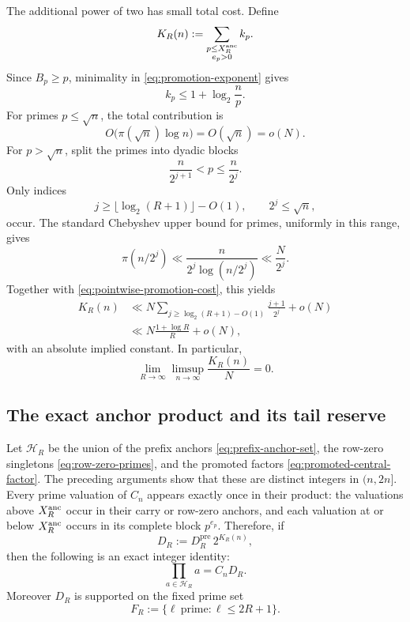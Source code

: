 \documentclass[11pt]{article}
\numberwithin{equation}{section}
\theoremstyle{definition}
\theoremstyle{remark}
\newcommand{\1}{\mathbf 1}
\newcommand{\e}{\mathrm e}
\begin{document}
The additional power of two has small total cost.  Define
\begin{equation}
 K_R(n):=\sum_{\substack{p\le X_R^{\rm anc}\\e_p>0}}k_p.
 \label{eq:total-promotion-cost}
\end{equation}
Since \(B_p\ge p\), minimality in
\eqref{eq:promotion-exponent} gives
\begin{equation}
                     k_p\le1+\log_2\frac np.
                     \label{eq:pointwise-promotion-cost}
\end{equation}
For primes \(p\le\sqrt n\), the total contribution is
\[
        O\bigl(\pi(\sqrt n)\log n\bigr)=O(\sqrt n)=o(N).
\]
For \(p>\sqrt n\), split the primes into dyadic blocks
\[
       \frac{n}{2^{j+1}}<p\le\frac{n}{2^j}.
\]
Only indices
\[
 j\ge\lfloor\log_2(R+1)\rfloor-O(1),
 \qquad 2^j\le\sqrt n,
\]
occur.  The standard Chebyshev upper bound for primes, uniformly in this
range, gives
\[
 \pi(n/2^j)\ll
 \frac{n}{2^j\log(n/2^j)}
 \ll\frac{N}{2^j}.
\]
Together with \eqref{eq:pointwise-promotion-cost}, this yields
\begin{equation}
 \begin{split}
 K_R(n)
  &\ll N\sum_{j\ge\log_2(R+1)-O(1)}
          \frac{j+1}{2^j}+o(N)\\
  &\ll N\frac{1+\log R}{R}+o(N),
 \end{split}
 \label{eq:dyadic-promotion-bound}
\end{equation}
with an absolute implied constant.  In particular,
\begin{equation}
 \lim_{R\to\infty}\limsup_{n\to\infty}\frac{K_R(n)}N=0.
 \label{eq:promotion-double-limit}
\end{equation}

\subsection{The exact anchor product and its tail reserve}
\label{sec:full-central-anchor}

Let \(\mathcal H_R\) be the union of the prefix anchors
\eqref{eq:prefix-anchor-set}, the row-zero singletons
\eqref{eq:row-zero-primes}, and the promoted factors
\eqref{eq:promoted-central-factor}.  The preceding arguments show that
these are distinct integers in \((n,2n]\).  Every prime valuation of
\(C_n\) appears exactly once in their product: the valuations above
\(X_R^{\rm anc}\) occur in their carry or row-zero anchors, and each valuation at
or below \(X_R^{\rm anc}\) occurs in its complete block \(p^{e_p}\).  Therefore,
if
\begin{equation}
 D_R:=D_R^{\mathrm{pre}}\,2^{K_R(n)},
 \label{eq:full-anchor-divisor}
\end{equation}
then the following is an exact integer identity:
\begin{equation}
                  \prod_{a\in\mathcal H_R}a=C_nD_R.
                  \label{eq:exact-anchor-product}
\end{equation}
Moreover \(D_R\) is supported on the fixed prime set
\begin{equation}
        F_R:=\{\ell\ \text{prime}:\ell\le2R+1\}.
        \label{eq:anchor-prime-set}
\end{equation}
\end{document}
